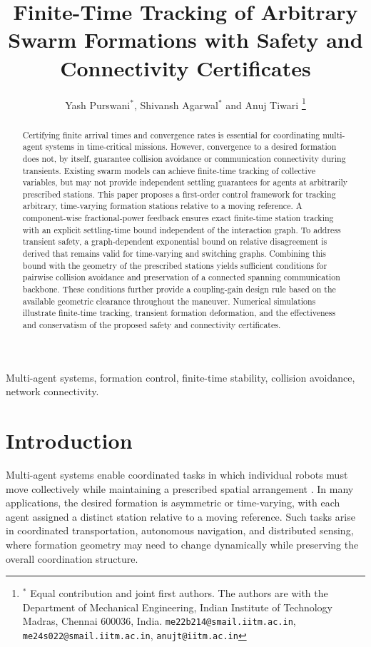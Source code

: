 \documentclass[letterpaper,10pt,conference]{ieeeconf}
\title{Finite-Time Tracking of Arbitrary Swarm Formations with Safety and Connectivity Certificates}
\author{Yash Purswani$^{*}$\orcidlink{0009-0002-9718-8160},
        Shivansh Agarwal$^{*}$\orcidlink{0009-0005-5756-2316}
        and Anuj Tiwari\orcidlink{0000-0003-3685-8888}%
\thanks{$^*$ Equal contribution and joint first authors. The authors are with the Department of Mechanical Engineering,
Indian Institute of Technology Madras, Chennai 600036, India.
{\tt\small me22b214@smail.iitm.ac.in},
{\tt\small me24s022@smail.iitm.ac.in},
{\tt\small anujt@iitm.ac.in}}
}
\begin{document}
\maketitle

\begin{abstract}
Certifying finite arrival times and convergence rates is essential for coordinating multi-agent systems in time-critical missions. However, convergence to a desired formation does not, by itself, guarantee collision avoidance or communication connectivity during transients. Existing swarm models can achieve finite-time tracking of collective variables, but may not provide independent settling guarantees for agents at arbitrarily prescribed stations. This paper proposes a first-order control framework for tracking arbitrary, time-varying formation stations relative to a moving reference. A component-wise fractional-power feedback ensures exact finite-time station tracking with an explicit settling-time bound independent of the interaction graph. To address transient safety, a graph-dependent exponential bound on relative disagreement is derived that remains valid for time-varying and switching graphs. Combining this bound with the geometry of the prescribed stations yields sufficient conditions for pairwise collision avoidance and preservation of a connected spanning communication backbone. These conditions further provide a coupling-gain design rule based on the available geometric clearance throughout the maneuver. Numerical simulations illustrate finite-time tracking, transient formation deformation, and the effectiveness and conservatism of the proposed safety and connectivity certificates.

\end{abstract}

\begin{keywords}
Multi-agent systems, formation control, finite-time stability, collision avoidance, network connectivity.
\end{keywords}

\section{Introduction}
\label{sec:intro}

Multi-agent systems enable coordinated tasks in which individual robots must move collectively while maintaining a prescribed spatial arrangement \cite{oh2015survey}. In many applications, the desired formation is asymmetric or time-varying, with each agent assigned a distinct station relative to a moving reference. Such tasks arise in coordinated transportation, autonomous navigation, and distributed sensing, where formation geometry may need to change dynamically while preserving the overall coordination structure.
\end{document}
